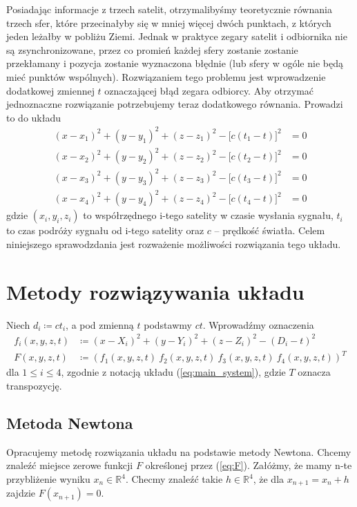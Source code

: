 \documentclass{article}
\begin{document}
Posiadając informacje z trzech satelit, otrzymalibyśmy teoretycznie równania trzech sfer, które przecinałyby się w
mniej więcej dwóch punktach, z których jeden leżałby w pobliżu Ziemi. Jednak w praktyce zegary satelit i odbiornika
nie są zsynchronizowane, przez co promień każdej sfery zostanie zostanie przekłamany i pozycja zostanie wyznaczona błędnie
(lub sfery w ogóle nie będą mieć punktów wspólnych). Rozwiązaniem tego problemu jest wprowadzenie dodatkowej zmiennej $t$
oznaczającej błąd zegara odbiorcy. Aby otrzymać jednoznaczne rozwiązanie potrzebujemy teraz dodatkowego równania.
Prowadzi to do układu
\begin{equation} \label{eq:main_system}
\begin{aligned}
    (x-x_1)^2 + (y-y_1)^2 + (z-z_1)^2 - \big[c(t_1-t)\big]^2 &= 0 \\
    (x-x_2)^2 + (y-y_2)^2 + (z-z_2)^2 - \big[c(t_2-t)\big]^2 &= 0 \\
    (x-x_3)^2 + (y-y_3)^2 + (z-z_3)^2 - \big[c(t_3-t)\big]^2 &= 0 \\
    (x-x_4)^2 + (y-y_4)^2 + (z-z_4)^2 - \big[c(t_4-t)\big]^2 &= 0
\end{aligned}
\end{equation}
gdzie $(x_i, y_i, z_i)$ to współrzędnego i-tego satelity w czasie wysłania sygnału, $t_i$ to czas podróży sygnału od
i-tego satelity oraz $c$ -- prędkość światła.
Celem niniejszego sprawodzdania jest rozważenie możliwości rozwiązania tego układu.

\section{Metody rozwiązywania układu}
Niech $d_i \coloneqq ct_i$, a pod zmienną $t$ podstawmy $ct$.
Wprowadźmy oznaczenia
\begin{align}
f_i(x, y, z, t) &\coloneqq (x-X_i)^2 + (y-Y_i)^2 + (z-Z_i)^2 - (D_i-t)^2 \\
\label{eq:F} F(x, y, z, t) &\coloneqq (f_1(x, y, z, t) \ f_2(x, y, z, t) \ f_3(x, y, z, t) \ f_4(x, y, z, t))^T
\end{align}
dla $1 \leq i \leq 4$, zgodnie z notacją układu (\ref{eq:main_system}), gdzie $T$ oznacza transpozycję.

\subsection{Metoda Newtona}
Opracujemy metodę rozwiązania układu na podstawie metody Newtona. Chcemy znaleźć miejsce zerowe funkcji
$F$ określonej przez (\ref{eq:F}). Załóżmy, że mamy n-te przybliżenie wyniku $x_n \in \mathbb{R}^4$.
Checmy znaleźć takie $h \in \mathbb{R}^4$, że dla $x_{n+1} = x_n + h$ zajdzie $F(x_{n+1}) = 0$.
\end{document}
